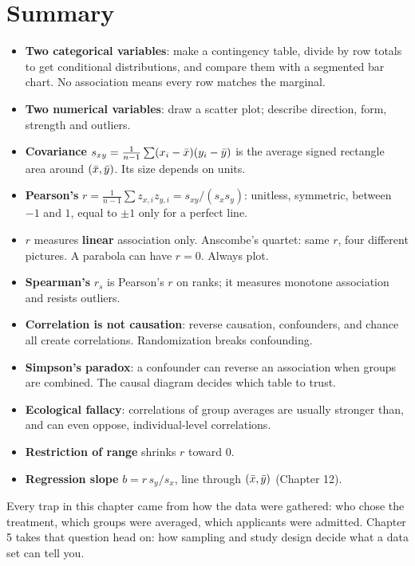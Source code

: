 \section{Summary}
\label{sec:corr-summary}

\begin{itemize}
  \item \textbf{Two categorical variables}: make a contingency table, divide by row
    totals to get conditional distributions, and compare them with a segmented bar
    chart. No association means every row matches the marginal.
  \item \textbf{Two numerical variables}: draw a scatter plot; describe direction,
    form, strength and outliers.
  \item \textbf{Covariance} $s_{xy} = \frac{1}{n-1}\sum (x_i-\bar{x})(y_i-\bar{y})$ is the
    average signed rectangle area around $(\bar{x},\bar{y})$. Its size depends on units.
  \item \textbf{Pearson's} $r = \frac{1}{n-1}\sum z_{x,i}z_{y,i} = s_{xy}/(s_x s_y)$:
    unitless, symmetric, between $-1$ and $1$, equal to $\pm1$ only for a perfect line.
  \item $r$ measures \textbf{linear} association only. Anscombe's quartet: same $r$,
    four different pictures. A parabola can have $r=0$. Always plot.
  \item \textbf{Spearman's} $r_s$ is Pearson's $r$ on ranks; it measures monotone
    association and resists outliers.
  \item \textbf{Correlation is not causation}: reverse causation, confounders, and
    chance all create correlations. Randomization breaks confounding.
  \item \textbf{Simpson's paradox}: a confounder can reverse an association when groups
    are combined. The causal diagram decides which table to trust.
  \item \textbf{Ecological fallacy}: correlations of group averages are usually
    stronger than, and can even oppose, individual-level correlations.
  \item \textbf{Restriction of range} shrinks $r$ toward 0.
  \item \textbf{Regression slope} $b = r\,s_y/s_x$, line through $(\bar{x},\bar{y})$
    (Chapter 12).
\end{itemize}

Every trap in this chapter came from how the data were gathered: who chose the
treatment, which groups were averaged, which applicants were admitted. Chapter 5
takes that question head on: how sampling and study design decide what a data set
can tell you.

